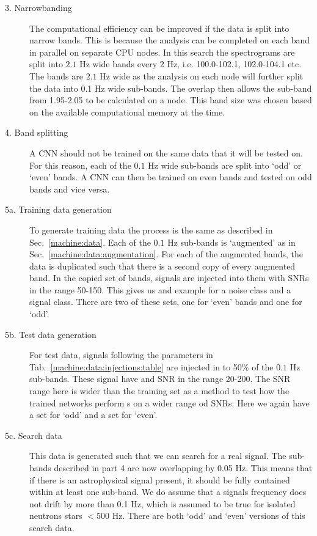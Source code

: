 \begin{description}
	\item[3. Narrowbanding] The computational efficiency can be improved if the data is split into narrow bands.
	This is because the analysis can be completed on each band in parallel on separate CPU nodes. 
	In this search the spectrograms are split into $2.1$ Hz wide bands every $2$ Hz, i.e.
	100.0-102.1, 102.0-104.1 etc. The bands are $2.1$ Hz wide as the analysis on each node will further split the data into 0.1 Hz wide sub-bands. 
	The overlap then allows the sub-band from 1.95-2.05 to be calculated on a node.
	This band size was chosen based on the available
	computational memory at the time. 
	\item[4. Band splitting] A \gls{CNN} should not be trained on the same
	data that it will be tested on.
	For this reason, each of the $0.1$ Hz wide sub-bands are split
	into `odd' or `even' bands. A \gls{CNN} can then be trained on even bands and tested on odd bands and vice versa.
	\item[5a. Training data generation] To generate training data the process is
	the same as described in Sec.~\ref{machine:data}. Each of the $0.1$ Hz sub-bands is
	`augmented' as in Sec.~\ref{machine:data:augmentation}. For each of the augmented
	bands, the data is duplicated such that there is a second copy of every augmented band. 
	In the copied set of bands, signals are injected into them with
	\glspl{SNR} in the range 50-150. This gives us and example for a noise class and
	a signal class. There are two of these sets, one for `even' bands and
	one for `odd'.
	\item[5b. Test data generation] For test data, signals following the parameters in
	Tab.~\ref{machine:data:injections:table} are injected in to 50\% of the $0.1$ Hz
	sub-bands. These signal have and \gls{SNR} in the range 20-200. The \gls{SNR} range here is wider than the training set as a method to test how the trained networks perform s on a wider range od \glspl{SNR}. Here we again have a
	set for `odd' and a set for `even'.
	\item[5c. Search data] This data is generated such that we can search for a
	real signal. The sub-bands described in part 4 are now overlapping by 0.05 Hz.
	This means that if there is an astrophysical signal present, it should be fully contained within at
	least one sub-band. We do assume that a signals frequency does not drift by more than 0.1 Hz, which is assumed to be true for isolated neutrons stars $< 500$ Hz.  There are both `odd' and `even' versions of this search data.

\end{description}
